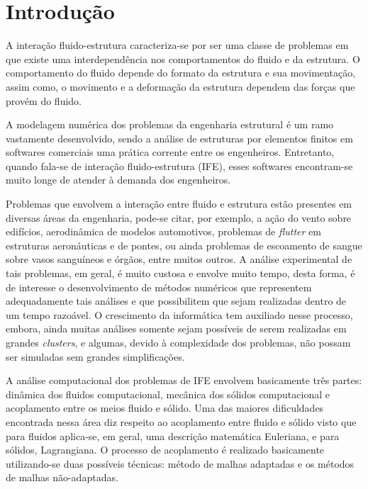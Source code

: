 \documentclass[tese_patricia.tex]{subfiles}
\begin{document}
\chapter[Introdução]{Introdução}\label{capitulo:introducao}

A interação fluido-estrutura caracteriza-se por ser uma classe de problemas em que existe uma interdependência nos comportamentos do fluido e da estrutura. O comportamento do fluido depende do formato da estrutura e sua movimentação, assim como, o movimento e a deformação da estrutura dependem das forças que provém do fluido.

A modelagem numérica dos problemas da engenharia estrutural é um ramo vastamente desenvolvido, sendo a análise de estruturas por elementos finitos em softwares comerciais uma prática corrente entre os engenheiros. Entretanto, quando fala-se de interação fluido-estrutura (IFE), esses softwares encontram-se muito longe de atender à demanda dos engenheiros. 

Problemas que envolvem a interação entre fluido e estrutura estão presentes em diversas áreas da engenharia, pode-se citar, por exemplo, a ação do vento sobre edifícios, aerodinâmica de modelos automotivos, problemas de \textit{flutter} em estruturas aeronáuticas e de pontes, ou ainda problemas de escoamento de sangue sobre vasos sanguíneos e órgãos, entre muitos outros. A análise experimental de tais problemas, em geral, é muito custosa e envolve muito tempo, desta forma, é de interesse o desenvolvimento de métodos numéricos que representem adequadamente tais análises e que possibilitem que sejam realizadas dentro de um tempo razoável. O crescimento da informática tem auxiliado nesse processo, embora, ainda muitas análises somente sejam possíveis de serem realizadas em grandes \textit{clusters}, e algumas, devido à complexidade dos problemas, não possam ser simuladas sem grandes simplificações.

A análise computacional dos problemas de IFE envolvem basicamente três partes: dinâmica dos fluidos computacional, mecânica dos sólidos computacional e acoplamento entre os meios fluido e sólido. Uma das maiores dificuldades encontrada nessa área diz respeito ao acoplamento entre fluido e sólido visto que para fluidos aplica-se, em geral, uma descrição matemática Euleriana, e para sólidos, Lagrangiana. O processo de acoplamento é realizado basicamente utilizando-se duas possíveis técnicas: método de malhas adaptadas e os métodos de malhas não-adaptadas. 
\end{document}

